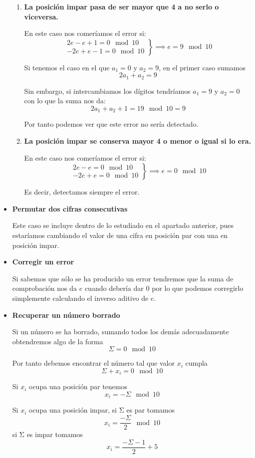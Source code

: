 \begin{problem}[5]
\begin{itemize}
\begin{enumerate}
\item \textbf{La posición impar pasa de ser mayor que 4 a no serlo o viceversa.}

En este caso nos comeríamos el error si:
\[\left.\begin{array}{l}
2e - e + 1 = 0 \mod 10 \\
-2e + e -1 = 0 \mod 10
\end{array}\right\} \implies e=9 \mod 10\]

Si tenemos el caso en el que $a_1=0$ y $a_2=9$, en el primer caso sumamos
\[2a_1+a_2 = 9\]

Sin embargo, si intercambiamos los dígitos tendríamos $a_1=9$ y $a_2=0$ con lo que la suma nos da:
\[2a_1+a_2+1 = 19 \mod 10 = 9\]

Por tanto podemos ver que este error no sería detectado.

\item \textbf{La posición impar se conserva mayor 4 o menor o igual si lo era.}

En este caso nos comeríamos el error si:
\[\left.\begin{array}{l}
2e - e = 0 \mod 10 \\
-2e + e = 0 \mod 10
\end{array}\right\} \implies e=0 \mod 10\]

Es decir, detectamos siempre el error.

\end{enumerate}

\item \textbf{Permutar dos cifras consecutivas}

Este caso se incluye dentro de lo estudiado en el apartado anterior, pues estaríamos cambiando el valor de una cifra en posición par con una en posición impar.

\item \textbf{Corregir un error}

Si sabemos que sólo se ha producido un error tendremos que la suma de comprobación nos da $e$ cuando debería dar $0$ por lo que podemos corregirlo simplemente calculando el inverso aditivo de $e$.

\item \textbf{Recuperar un número borrado}

Si un número se ha borrado, sumando todos los demás adecuadamente obtendremos algo de la forma
\[Σ = 0 \mod 10\]

Por tanto debemos encontrar el número tal que valor $x_i$ cumpla
\[Σ+x_i = 0 \mod 10\]

Si $x_i$ ocupa una posición par tenemos
\[x_i = - Σ \mod 10\]

Si $x_i$ ocupa una posición impar, si Σ es par tomamos
\[x_i = \frac{-Σ}{2} \mod 10\]
si Σ es impar tomamos
\[x_i = \frac{-Σ-1}{2}+5\]
\end{itemize}
\end{problem}

